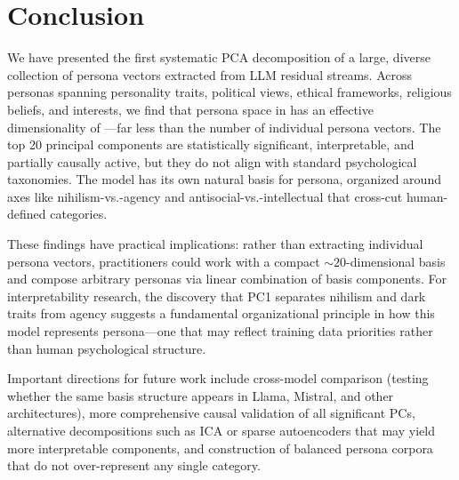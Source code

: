 \section{Conclusion}
\label{sec:conclusion}

We have presented the first systematic PCA decomposition of a large, diverse collection of persona vectors extracted from LLM residual streams. Across \npersonas personas spanning personality traits, political views, ethical frameworks, religious beliefs, and interests, we find that persona space in \qwen has an effective dimensionality of \effdim---far less than the number of individual persona vectors. The top 20 principal components are statistically significant, interpretable, and partially causally active, but they do not align with standard psychological taxonomies. The model has its own natural basis for persona, organized around axes like nihilism-vs.-agency and antisocial-vs.-intellectual that cross-cut human-defined categories.

These findings have practical implications: rather than extracting individual persona vectors, practitioners could work with a compact ${\sim}20$-dimensional basis and compose arbitrary personas via linear combination of basis components. For interpretability research, the discovery that PC1 separates nihilism and dark traits from agency suggests a fundamental organizational principle in how this model represents persona---one that may reflect training data priorities rather than human psychological structure.

Important directions for future work include cross-model comparison (testing whether the same basis structure appears in Llama, Mistral, and other architectures), more comprehensive causal validation of all significant PCs, alternative decompositions such as ICA or sparse autoencoders that may yield more interpretable components, and construction of balanced persona corpora that do not over-represent any single category.
